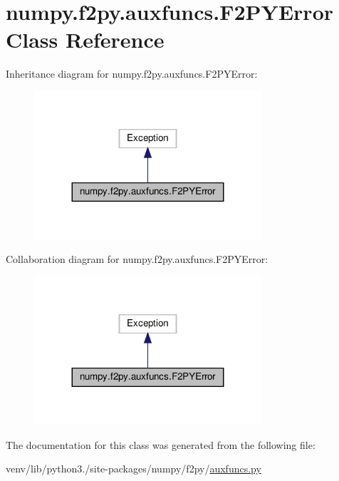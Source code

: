 \hypertarget{classnumpy_1_1f2py_1_1auxfuncs_1_1F2PYError}{}\section{numpy.\+f2py.\+auxfuncs.\+F2\+P\+Y\+Error Class Reference}
\label{classnumpy_1_1f2py_1_1auxfuncs_1_1F2PYError}


Inheritance diagram for numpy.\+f2py.\+auxfuncs.\+F2\+P\+Y\+Error\+:
\nopagebreak
\begin{figure}[H]
\begin{center}
\leavevmode
\includegraphics[width=239pt]{classnumpy_1_1f2py_1_1auxfuncs_1_1F2PYError__inherit__graph}
\end{center}
\end{figure}


Collaboration diagram for numpy.\+f2py.\+auxfuncs.\+F2\+P\+Y\+Error\+:
\nopagebreak
\begin{figure}[H]
\begin{center}
\leavevmode
\includegraphics[width=239pt]{classnumpy_1_1f2py_1_1auxfuncs_1_1F2PYError__coll__graph}
\end{center}
\end{figure}


The documentation for this class was generated from the following file\+:\begin{DoxyCompactItemize}
\item 
venv/lib/python3./site-\/packages/numpy/f2py/\hyperlink{auxfuncs_8py}{auxfuncs.\+py}\end{DoxyCompactItemize}
